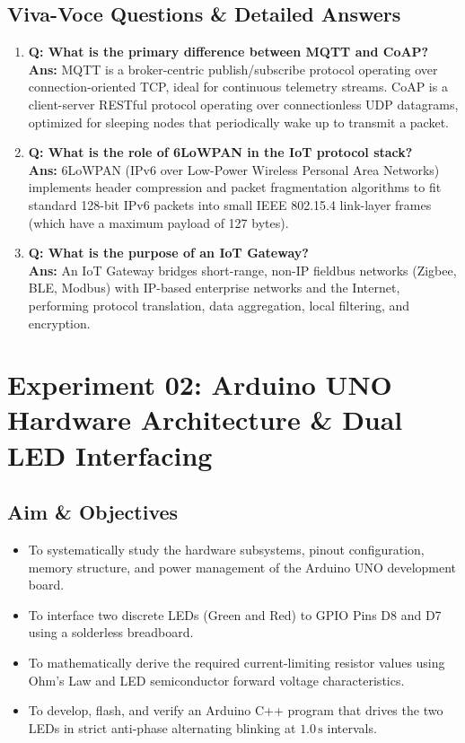 \documentclass[11pt,a4paper]{article}
\begin{document}
\subsection{Viva-Voce Questions \& Detailed Answers}
\begin{enumerate}[leftmargin=*]
    \item \textbf{Q: What is the primary difference between MQTT and CoAP?}\\
    \textbf{Ans:} MQTT is a broker-centric publish/subscribe protocol operating over connection-oriented TCP, ideal for continuous telemetry streams. CoAP is a client-server RESTful protocol operating over connectionless UDP datagrams, optimized for sleeping nodes that periodically wake up to transmit a packet.
    \item \textbf{Q: What is the role of 6LoWPAN in the IoT protocol stack?}\\
    \textbf{Ans:} 6LoWPAN (IPv6 over Low-Power Wireless Personal Area Networks) implements header compression and packet fragmentation algorithms to fit standard 128-bit IPv6 packets into small IEEE 802.15.4 link-layer frames (which have a maximum payload of 127 bytes).
    \item \textbf{Q: What is the purpose of an IoT Gateway?}\\
    \textbf{Ans:} An IoT Gateway bridges short-range, non-IP fieldbus networks (Zigbee, BLE, Modbus) with IP-based enterprise networks and the Internet, performing protocol translation, data aggregation, local filtering, and encryption.
\end{enumerate}

\newpage

\section{Experiment 02: Arduino UNO Hardware Architecture \& Dual LED Interfacing}

\subsection{Aim \& Objectives}
\begin{itemize}[noitemsep]
    \item To systematically study the hardware subsystems, pinout configuration, memory structure, and power management of the Arduino UNO development board.
    \item To interface two discrete LEDs (Green and Red) to GPIO Pins D8 and D7 using a solderless breadboard.
    \item To mathematically derive the required current-limiting resistor values using Ohm's Law and LED semiconductor forward voltage characteristics.
    \item To develop, flash, and verify an Arduino C++ program that drives the two LEDs in strict anti-phase alternating blinking at $1.0\,\text{s}$ intervals.
\end{itemize}
\end{document}
